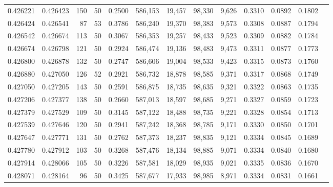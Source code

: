 \begin{tabular}{rrrrrrrrrrrrr}
0.426221 & 0.426423 &   150 &  50 &                                     0.2500 & 586,153 &  19,457 &  98,330 &   9,626 & 0.3310 & 0.0892 & 0.1802 \\
0.426424 & 0.426541 &    87 &  53 &                                     0.3786 & 586,240 &  19,370 &  98,383 &   9,573 & 0.3308 & 0.0887 & 0.1794 \\
0.426542 & 0.426674 &   113 &  50 &                                     0.3067 & 586,353 &  19,257 &  98,433 &   9,523 & 0.3309 & 0.0882 & 0.1784 \\
0.426674 & 0.426798 &   121 &  50 &                                     0.2924 & 586,474 &  19,136 &  98,483 &   9,473 & 0.3311 & 0.0877 & 0.1773 \\
0.426800 & 0.426878 &   132 &  50 &                                     0.2747 & 586,606 &  19,004 &  98,533 &   9,423 & 0.3315 & 0.0873 & 0.1760 \\
0.426880 & 0.427050 &   126 &  52 &                                     0.2921 & 586,732 &  18,878 &  98,585 &   9,371 & 0.3317 & 0.0868 & 0.1749 \\
0.427050 & 0.427205 &   143 &  50 &                                     0.2591 & 586,875 &  18,735 &  98,635 &   9,321 & 0.3322 & 0.0863 & 0.1735 \\
0.427206 & 0.427377 &   138 &  50 &                                     0.2660 & 587,013 &  18,597 &  98,685 &   9,271 & 0.3327 & 0.0859 & 0.1723 \\
0.427379 & 0.427529 &   109 &  50 &                                     0.3145 & 587,122 &  18,488 &  98,735 &   9,221 & 0.3328 & 0.0854 & 0.1713 \\
0.427539 & 0.427646 &   120 &  50 &                                     0.2941 & 587,242 &  18,368 &  98,785 &   9,171 & 0.3330 & 0.0850 & 0.1701 \\
0.427647 & 0.427771 &   131 &  50 &                                     0.2762 & 587,373 &  18,237 &  98,835 &   9,121 & 0.3334 & 0.0845 & 0.1689 \\
0.427780 & 0.427912 &   103 &  50 &                                     0.3268 & 587,476 &  18,134 &  98,885 &   9,071 & 0.3334 & 0.0840 & 0.1680 \\
0.427914 & 0.428066 &   105 &  50 &                                     0.3226 & 587,581 &  18,029 &  98,935 &   9,021 & 0.3335 & 0.0836 & 0.1670 \\
0.428071 & 0.428164 &    96 &  50 &                                     0.3425 & 587,677 &  17,933 &  98,985 &   8,971 & 0.3334 & 0.0831 & 0.1661 \\

\end{tabular}
